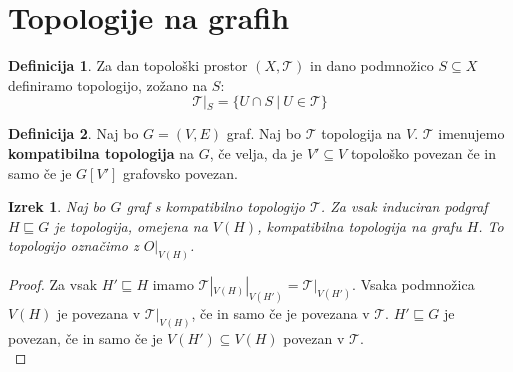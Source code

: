 \documentclass[a4paper, 12pt]{book}
\newtheorem{theorem}{Izrek}[section]
\theoremstyle{definition}
\newtheorem{definition}{Definicija}[section]
\theoremstyle{remark}
\begin{document}
\section{Topologije na grafih}
\begin{definition}
  Za dan topološki prostor $(X, \mathcal{T})$ in dano podmnožico $S \subseteq X$ definiramo
  topologijo, zožano na $S$: \[\mathcal{T}|_S = \{U \cap S\ |\ U \in \mathcal{T}\}\]
\end{definition}
\begin{definition}
  Naj bo $G = (V,E)$ graf. Naj bo $\mathcal{T}$ topologija na $V$. $\mathcal{T}$ imenujemo \textbf{kompatibilna
  topologija} na $G$, če velja, da je
  $V' \subseteq V$ topološko povezan če in samo če je $G[V']$ grafovsko povezan.
\end{definition}
\begin{theorem}\label{theorem1}
  Naj bo $G$ graf s kompatibilno topologijo $\mathcal{T}$. Za vsak induciran podgraf
  $H \sqsubseteq G$ je topologija, omejena na $V(H)$, kompatibilna topologija
  na grafu $H$. To topologijo označimo z $O|_{V(H)}$.
\end{theorem}
\begin{proof}
  Za vsak $H' \sqsubseteq H$ imamo $\mathcal{T}|_{V(H)}|_{V(H')} = \mathcal{T}|_{V(H')}$. 
  Vsaka podmnožica $V(H)$ je povezana v $\mathcal{T}|_{V(H)}$, če in samo če je povezana v $\mathcal{T}$.
  $H' \sqsubseteq G$ je povezan, če in samo če je $V(H') \subseteq V(H)$ povezan v $\mathcal{T}$.\\
\end{proof}
\end{document}

